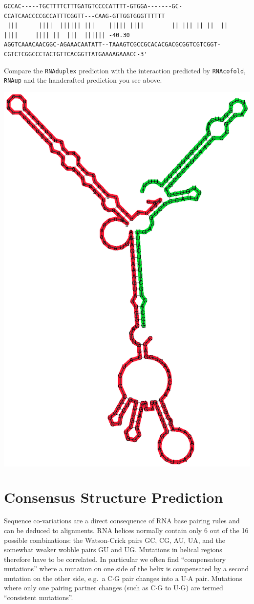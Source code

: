 \documentclass[a4paper]{article}
\begin{document}
\begin{tiny}
\begin{verbatim}
GCCAC-----TGCTTTTCTTTGATGTCCCCATTTT-GTGGA-------GC-CCATCAACCCCGCCATTTCGGTT---CAAG-GTTGGTGGGTTTTTT
 |||      ||||  |||||| |||    ||||| ||||        || ||| || ||  ||    ||||     |||| ||  |||  |||||| -40.30
AGGTCAAACAACGGC-AGAAACAATATT--TAAAGTCGCCGCACACGACGCGGTCGTCGGT-CGTCTCGGCCCTACTGTTCACGGTTATGAAAAGAAACC-3'
\end{verbatim}
\end{tiny}
\noindent
Compare the \texttt{RNAduplex} prediction with the interaction predicted by \texttt{RNAcofold}, \texttt{RNAup} and the handcrafted prediction you see above.

\begin{center}
  \includegraphics[width=0.7\linewidth]{Figures/OmpN_cofold.eps}
\end{center}

\pagebreak[3]
%
\section{Consensus Structure Prediction}
Sequence co-variations are a direct consequence of RNA base pairing
rules and can be deduced to alignments. RNA helices normally contain 
only 6 out of the 16 possible 
combinations: the Watson-Crick pairs \textsf{GC}, \textsf{CG},
\textsf{AU}, \textsf{UA}, and the somewhat weaker wobble pairs
\textsf{GU} and \textsf{UG}. Mutations in helical regions therefore
have to be correlated. In particular we often find ``compensatory
mutations'' where a mutation on one side of the helix is compensated
by a second mutation on the other side, e.g.\ a
\textsf{C}$\cdot$\textsf{G} pair changes into a
\textsf{U}$\cdot$\textsf{A} pair. Mutations where only one pairing
partner changes (such as \textsf{C}$\cdot$\textsf{G} to
\textsf{U}$\cdot$\textsf{G}) are termed ``consistent mutations''.
\end{document}
